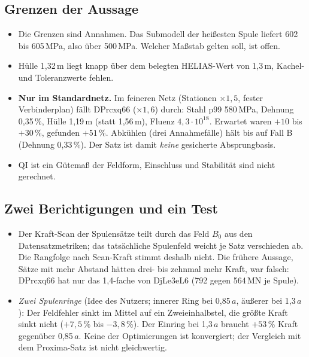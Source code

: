 \subsection*{Grenzen der Aussage}
\begin{itemize}\itemsep1pt
\item Die Grenzen sind Annahmen. Das Submodell der heißesten Spule liefert 602 bis 605\,MPa, also über 500\,MPa. Welcher Maßstab gelten soll, ist offen.
\item Hülle 1,32\,m liegt knapp über dem belegten HELIAS-Wert von 1,3\,m, Kachel- und Toleranzwerte fehlen.
\item \textbf{Nur im Standardnetz.} Im feineren Netz (Stationen $\times1{,}5$, fester Verbinderplan) fällt DPrcxq66 ($\times1{,}6$) durch: Stahl p99 580\,MPa, Dehnung 0,35\,\%, Hülle 1,19\,m (statt 1,56\,m), Fluenz $4{,}3\cdot10^{18}$. Erwartet waren $+10$ bis $+30$\,\%, gefunden $+51$\,\%. Abkühlen (drei Annahmefälle) hält bis auf Fall B (Dehnung 0,33\,\%). Der Satz ist damit \emph{keine} gesicherte Absprungbasis.
\item QI ist ein Gütemaß der Feldform, Einschluss und Stabilität sind nicht gerechnet.
\end{itemize}

\subsection*{Zwei Berichtigungen und ein Test}
\begin{itemize}\itemsep1pt
\item Der Kraft-Scan der Spulensätze teilt durch das Feld $B_0$ aus den Datensatzmetriken; das tatsächliche Spulenfeld weicht je Satz verschieden ab. Die Rangfolge nach Scan-Kraft stimmt deshalb nicht. Die frühere Aussage, Sätze mit mehr Abstand hätten drei- bis zehnmal mehr Kraft, war falsch: DPrcxq66 hat nur das 1,4-fache von DjLe3eL6 (792 gegen 564\,MN je Spule).
\item \emph{Zwei Spulenringe} (Idee des Nutzers; innerer Ring bei 0,85\,$a$, äußerer bei 1,3\,$a$): Der Feldfehler sinkt im Mittel auf ein Zweieinhalbstel, die größte Kraft sinkt nicht ($+7{,}5$\,\% bis $-3{,}8$\,\%). Der Einring bei 1,3\,$a$ braucht $+53$\,\% Kraft gegenüber 0,85\,$a$. Keine der Optimierungen ist konvergiert; der Vergleich mit dem Proxima-Satz ist nicht gleichwertig.
\end{itemize}
